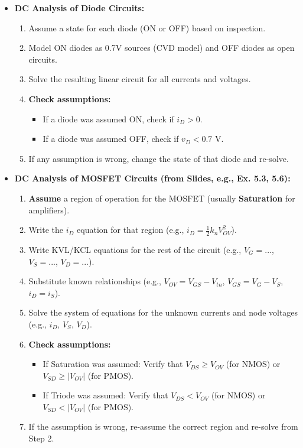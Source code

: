 \documentclass[12pt, letterpaper]{article}
\begin{document}
\begin{itemize}
    \item \textbf{DC Analysis of Diode Circuits:}
    \begin{enumerate}
        \item Assume a state for each diode (ON or OFF) based on inspection.
        \item Model ON diodes as 0.7V sources (CVD model) and OFF diodes as open circuits.
        \item Solve the resulting linear circuit for all currents and voltages.
        \item \textbf{Check assumptions:}
        \begin{itemize}
            \item If a diode was assumed ON, check if $i_D > 0$.
            \item If a diode was assumed OFF, check if $v_D < 0.7 \text{ V}$.
        \end{itemize}
        \item If any assumption is wrong, change the state of that diode and re-solve.
    \end{enumerate}
    
    \item \textbf{DC Analysis of MOSFET Circuits (from Slides, e.g., Ex. 5.3, 5.6):}
    \begin{enumerate}
        \item \textbf{Assume} a region of operation for the MOSFET (usually \textbf{Saturation} for amplifiers).
        \item Write the $i_D$ equation for that region (e.g., $i_D = \frac{1}{2} k_n V_{OV}^2$).
        \item Write KVL/KCL equations for the rest of the circuit (e.g., $V_G = ...$, $V_S = ...$, $V_D = ...$).
        \item Substitute known relationships (e.g., $V_{OV} = V_{GS} - V_{tn}$, $V_{GS} = V_G - V_S$, $i_D = i_S$).
        \item Solve the system of equations for the unknown currents and node voltages (e.g., $i_D$, $V_S$, $V_D$).
        \item \textbf{Check assumptions:}
        \begin{itemize}
            \item If Saturation was assumed: Verify that $V_{DS} \ge V_{OV}$ (for NMOS) or $V_{SD} \ge |V_{OV}|$ (for PMOS).
            \item If Triode was assumed: Verify that $V_{DS} < V_{OV}$ (for NMOS) or $V_{SD} < |V_{OV}|$ (for PMOS).
        \end{itemize}
        \item If the assumption is wrong, re-assume the correct region and re-solve from Step 2.
    \end{enumerate}
    

\end{itemize}
\end{document}
